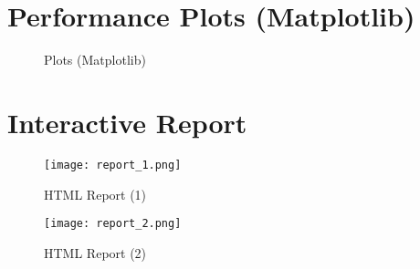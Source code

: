 \documentclass[12pt]{article}
\begin{document}
\section{Performance Plots (Matplotlib)}

\begin{figure}[H]
     \centering
    \begin{subfigure}[t]{0.42\textwidth}
    \end{subfigure}
    \hfill
    \begin{subfigure}[t]{0.42\textwidth}
    \end{subfigure}
    
    \begin{subfigure}[t]{0.42\textwidth}
    \end{subfigure}
    \hfill
    \begin{subfigure}[t]{0.42\textwidth}
    \end{subfigure}
    
    \begin{subfigure}[t]{0.42\textwidth}
    \end{subfigure}
    \hfill
    \begin{subfigure}[t]{0.42\textwidth}
    \end{subfigure}
    
    \begin{subfigure}[t]{0.9\textwidth}
    \end{subfigure}
    
    \caption{Plots (Matplotlib)}
    \label{fig:performance_plots}
\end{figure}

\section{Interactive Report}

\begin{figure}[H]
    \centering
    \texttt{[image: report\_1.png]}
    \caption{HTML Report (1)}
    \label{fig:html_report1}
\end{figure}
 
 \begin{figure}[H]
    \centering
    \texttt{[image: report\_2.png]}
    \caption{HTML Report (2)}
    \label{fig:html_report2}
\end{figure}
 
\end{document}

